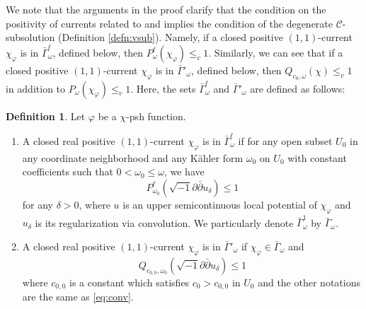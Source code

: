\documentclass{amsart}
\numberwithin{equation}{section}
\theoremstyle{plain}
\theoremstyle{definition}
\newtheorem{defn}[equation]{Definition}
\theoremstyle{remark}
\newcommand{\delb}{\sqrt{-1}\partial\bar{\partial}}
\begin{document}
We note that the arguments in the proof clarify that the condition on the positivity of currents related to \cite[Definition 3.3]{GChen} and \cite[Definition 1]{Datar-Pingali} implies the condition of the degenerate $\mathcal{C}$-subsolution (Definition \ref{defn:vsub}). Namely, if a closed positive $(1,1)$-current $\chi_\varphi$ is in $\bar{\Gamma}^\ell_\omega$, defined below, then $P^\ell_\omega(\chi_\varphi)\le_v 1$. Similarly, we can see that if a closed positive $(1,1)$-current $\chi_\varphi$ is in $\bar{\Gamma}'_\omega$, defined below, then $Q_{c_0,\omega}(\chi)\le_v 1$ in addition to $P_{\omega}(\chi_\varphi)\le_v1$.
Here, the sets $\bar{\Gamma}^\ell_\omega$ and $\bar{\Gamma}'_\omega$ are defined as follows:
\begin{defn}\label{def:gammabar}
    Let $\varphi$ be a $\chi$-psh function.
    \begin{enumerate}[label={\upshape(\roman*)}]
        \item\label{item:gammal} A closed real positive $(1,1)$-current $\chi_\varphi$ is in $\bar{\Gamma}^\ell_\omega$ if for any open subset $U_0$ in any coordinate neighborhood and any K{\"a}hler form $\omega_0$ on $U_0$ with constant coefficients such that $0<\omega_0 \le \omega$, we have
        \begin{equation}\label{eq:conv}
            P^\ell_{\omega_0}(\delb u_\delta) \le 1
        \end{equation} 
        for any $\delta>0$, where $u$ is an upper semicontinuous local potential of $\chi_\varphi$ and $u_\delta$ is its regularization via convolution. We particularly denote $\bar{\Gamma}^1_\omega$ by $\bar{\Gamma}_\omega$.
        \item\label{item:gamma'} A closed real positive $(1,1)$-current $\chi_\varphi$ is in $\bar{\Gamma}'_\omega$ if $\chi_\varphi\in\bar{\Gamma}_\omega$ and 
        $$Q_{c_{0,0},\omega_0}(\delb u_\delta) \le 1$$ 
        where $c_{0,0}$ is a constant which satisfies $c_0>c_{0,0}$ in $U_0$ and the other notations are the same as \eqref{eq:conv}.
    \end{enumerate}
\end{defn}
\end{document}
